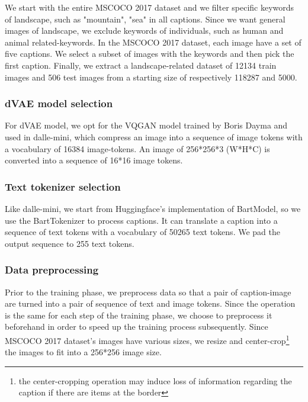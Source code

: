 \documentclass{article}
\begin{document}
We start with the entire MSCOCO 2017 dataset and we filter specific keywords of landscape, such as "mountain", "sea" in all captions. Since we want general images of landscape, we exclude keywords of individuals, such as human and animal related-keywords. In the MSCOCO 2017 dataset, each image have a set of five captions. We select a subset of images with the keywords and then pick the first caption. Finally, we extract a landscape-related dataset of 12134 train images and 506 test images from a starting size of respectively 118287 and 5000.

\subsubsection{dVAE model selection}
For dVAE model, we opt for the VQGAN model trained by Boris Dayma and used in dalle-mini, which compress an image into a sequence of image tokens with a vocabulary of 16384 image-tokens. An image of 256*256*3 (W*H*C) is converted into a sequence of 16*16 image tokens.

\subsubsection{Text tokenizer selection}
Like dalle-mini, we start from Huggingface's implementation of BartModel, so we use the BartTokenizer to process captions. It can translate a caption into a sequence of text tokens with a vocabulary of 50265 text tokens. We pad the output sequence to 255 text tokens.

\subsubsection{Data preprocessing}
Prior to the training phase, we preprocess data so that a pair of caption-image are turned into a pair of sequence of text and image tokens. Since the operation is the same for each step of the training phase, we choose to preprocess it beforehand in order to speed up the training process subsequently. Since MSCOCO 2017 dataset's images have various sizes, we resize and center-crop\footnote{the center-cropping operation may induce loss of information regarding the caption if there are items at the border} the images to fit into a 256*256 image size.
\end{document}

